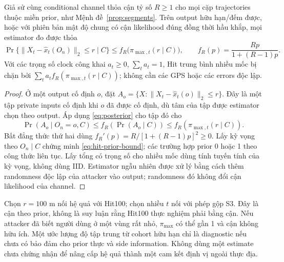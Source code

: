 \begin{corollary}\label{cor:hit-prior}
Giả sử cùng conditional channel thỏa cận tỷ số $R\ge1$ cho mọi cặp trajectories thuộc miền prior,
như Mệnh đề~\ref{prop:segments}. Trên output hữu hạn/đếm được, hoặc với phiên bản mật độ chung có
cận likelihood đúng đồng thời hầu khắp, mọi estimator đo được thỏa
\begin{equation}
\Pr\{\|X_t-\widehat x_t(O_n)\|_2\le r\mid C\}
\le f_R\bigl(\pi_{\max,t}(r\mid C)\bigr),\qquad
f_R(p)=\frac{Rp}{1+(R-1)p}.
\label{eq:hit-prior-bound}
\end{equation}
Với các trọng số clock công khai $a_t\ge0$, $\sum_ta_t=1$, Hit trung bình nhiều mốc bị chặn bởi
$\sum_ta_tf_R(\pi_{\max,t}(r\mid C))$; không cần các GPS hoặc các errors độc lập.
\end{corollary}
\begin{proof}
Ở một output cố định $o$, đặt $A_o=\{X:\|X_t-\widehat x_t(o)\|_2\le r\}$. Đây là một tập private
inputs cố định khi $o$ đã được cố định, dù tâm của tập được estimator chọn theo output.
Áp dụng \eqref{eq:posterior} cho tập đó cho
\[
\Pr(A_o\mid O_n=o,C)\le f_R(\Pr(A_o\mid C))
\le f_R(\pi_{\max,t}(r\mid C)).
\]
Bất đẳng thức thứ hai dùng $f_R'(p)=R/[1+(R-1)p]^2\ge0$. Lấy kỳ vọng theo $O_n\mid C$ chứng
minh \eqref{eq:hit-prior-bound}; các trường hợp prior 0 hoặc 1 theo công thức liên tục.
Lấy tổng có trọng số cho nhiều mốc dùng tính tuyến tính của kỳ vọng, không dùng IID.
Estimator ngẫu nhiên được xử lý bằng cách thêm randomness độc lập của attacker vào output;
randomness đó không đổi cận likelihood của channel.
\end{proof}

Chọn $r=100$ m nối hệ quả với Hit100; chọn nhiều $t$ nối với phép gộp S3. Đây là cận theo prior,
không là suy luận rằng Hit100 thực nghiệm phải bằng cận. Nếu attacker đã biết người dùng ở một
vùng rất nhỏ, $\pi_{\max}$ có thể gần 1 và cận không hữu ích. Một ước lượng độ tập trung từ cohort
hữu hạn chỉ là diagnostic nếu chưa có bảo đảm cho prior thực và side information. Không dùng
một estimate chưa chứng nhận để nâng cấp hệ quả thành một cam kết định vị ngoài thực địa.

